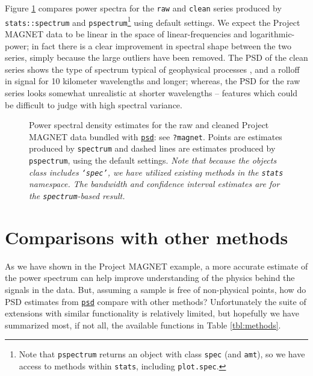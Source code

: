 \documentclass[10pt]{article}\usepackage[]{graphicx}\usepackage[]{color}
\newcommand{\Rcmd}[1]{\texttt{#1}}
\newcommand{\psd}[0]{\href{https://www.github.com/abarbour/psd/}{\color{blue}\Rcmd{psd}}}
\begin{document}
Figure \ref{fig:pmag} compares power spectra for the \Rcmd{raw} and \Rcmd{clean} 
series produced by \Rcmd{stats::spectrum} and \Rcmd{pspectrum}\footnote{
  Note that \Rcmd{pspectrum} returns an object with class \Rcmd{spec} (and \Rcmd{amt}), so 
  we have access to methods within \Rcmd{stats}, including \Rcmd{plot.spec}.
} using default settings.
%
We expect the Project MAGNET data to be linear in the space of
linear-frequencies and logarithmic-power; in fact there is a clear
improvement in spectral shape between the two series,
simply because the large outliers have been removed.
%
The PSD of the clean series shows the type of spectrum typical of 
geophysical processes \citep{agnew1992}, and a rolloff in signal
for 10 kilometer wavelengths and longer; whereas, the 
PSD for the raw series looks somewhat unrealistic at shorter wavelengths -- features 
which could be difficult to judge with high spectral variance.

\begin{figure}[!htbp]
\begin{center}

\caption{Power spectral density estimates for the raw and cleaned
         Project MAGNET data bundled with \psd{}: see \Rcmd{?magnet}. 
         Points are estimates produced by \Rcmd{spectrum} and
         dashed lines are estimates produced by \Rcmd{pspectrum}, using the
         default settings.
         \emph{Note that because the objects class includes \Rcmd{`spec'}, we have
         utilized existing methods in the \Rcmd{stats} namespace. The bandwidth
         and confidence interval estimates are for the \Rcmd{spectrum}-based result.}
}
\label{fig:pmag}
\end{center}
\end{figure}

\clearpage

\section{Comparisons with other methods}

As we have shown in the Project MAGNET example, a more accurate estimate
of the power spectrum can help improve understanding of the physics 
behind the signals in the data.
But, assuming a sample is free of non-physical points, how do
PSD estimates from \psd{} compare with other methods?
Unfortunately the suite of extensions with similar functionality
is relatively limited, but hopefully we have
summarized most, if not all, the available functions in Table \ref{tbl:methods}.
\end{document}
